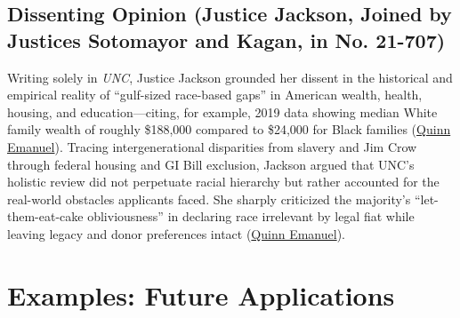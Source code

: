 \documentclass[12pt]{article}
\begin{document}
\subsection{Dissenting Opinion (Justice Jackson, Joined by Justices Sotomayor and Kagan, in No. 21-707)}

Writing solely in \textit{UNC}, Justice Jackson grounded her dissent in the historical and empirical reality of ``gulf-sized race-based gaps'' in American wealth, health, housing, and education---citing, for example, 2019 data showing median White family wealth of roughly \$188,000 compared to \$24,000 for Black families (\href{https://www.quinnemanuel.com/the-firm/publications/the-road-ahead-fostering-diversity-after-the-supreme-court-s-decision-overturning-affirmative-action-in-university-admissions/}{Quinn Emanuel}). Tracing intergenerational disparities from slavery and Jim Crow through federal housing and GI Bill exclusion, Jackson argued that UNC's holistic review did not perpetuate racial hierarchy but rather accounted for the real-world obstacles applicants faced. She sharply criticized the majority's ``let-them-eat-cake obliviousness'' in declaring race irrelevant by legal fiat while leaving legacy and donor preferences intact (\href{https://www.quinnemanuel.com/the-firm/publications/the-road-ahead-fostering-diversity-after-the-supreme-court-s-decision-overturning-affirmative-action-in-university-admissions/}{Quinn Emanuel}).

\section{Examples: Future Applications}
\end{document}
